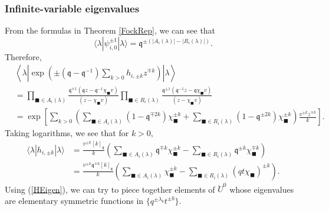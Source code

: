 \documentclass{amsart}
\newcommand{\qqq}{\mathfrak{q}}
\theoremstyle{remark}
\numberwithin{thm}{section}
\numberwithin{equation}{section}
\begin{document}
\subsubsection{Infinite-variable eigenvalues}
From the formulas in Theorem \ref{FockRep}, we can see that
\[
\langle\lambda|\psi_{i,0}^{\pm 1}|\lambda\rangle= \qqq^{\pm\left(|A_{i}(\lambda)|-|R_{i}(\lambda)|\right)}.
\]
Therefore,
\begin{align*}
&\left\langle\lambda\left|\exp\left(\pm(\qqq-\qqq^{-1})\sum_{k>0}h_{i,\pm k}z^{\mp k}\right)\right|\lambda\right\rangle\\
&=\prod_{\blacksquare\in A_{i}(\lambda)}\frac{\qqq^{\mp 1}\left(\qqq z-\qqq^{-1}\chi_{\blacksquare}v\right)}{\left( z-\chi_\blacksquare v\right)}
\prod_{\blacksquare\in R_{i}(\lambda)}\frac{\qqq^{\pm 1}\left(\qqq^{-1} z-\qqq\chi_\blacksquare v\right)}{\left( z-\chi_\blacksquare v\right)}\\
&= \exp\left[ \sum_{k>0}\left( \sum_{\blacksquare\in A_{i}(\lambda)}(1-\qqq^{\mp 2k})\chi_{\blacksquare}^{\pm k} +\sum_{\blacksquare\in R_{i}(\lambda)}(1-\qqq^{\pm 2k})\chi_\blacksquare^{\pm k}\right)\frac{v^{\pm k}z^{\mp k}}{k} \right].
\end{align*}
Taking logarithms, we see that for $k>0$,
\begin{equation}
\begin{aligned}
\langle\lambda|h_{i,\pm k}|\lambda\rangle &= \frac{v^{\pm k}[ k]_{\qqq}}{k}\left( \sum_{\blacksquare\in A_{i}(\lambda)}\qqq^{\mp k}\chi_\blacksquare^{\pm k} -\sum_{\blacksquare\in R_{i}(\lambda)}\qqq^{\pm k}\chi_\blacksquare^{\mp k}\right)\\
&= \frac{v^{\pm k}\qqq^{\mp k}[ k]_{\qqq}}{k}\left( \sum_{\blacksquare\in A_{i}(\lambda)}\chi_\blacksquare^{\pm k} - \sum_{\blacksquare\in R_{i}(\lambda)}(qt\chi_\blacksquare)^{\pm k}\right).
\end{aligned}
\label{HEigen}
\end{equation}
Using (\ref{HEigen}), we can try to piece together elements of $\ddot{U}^0$ whose eigenvalues are elementary symmetric functions in $\{q^{\pm\lambda_b}t^{\pm b}\}$.
\end{document}
